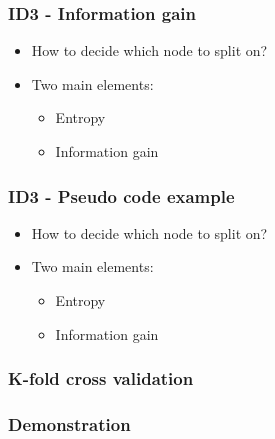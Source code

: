 \documentclass{beamer}
\begin{document}
\begin{frame}
\frametitle{ID3 - Information gain}
\begin{itemize}
		\item  How to decide which node to split on? 
		\item Two main elements:
		\begin{itemize}
			\item Entropy
			\item Information gain
		\end{itemize}

	\end{itemize}
\end{frame}

\begin{frame}
\frametitle{ID3 - Pseudo code example}
\begin{itemize}
		\item  How to decide which node to split on? 
		\item Two main elements:
		\begin{itemize}
			\item Entropy
			\item Information gain
		\end{itemize}

	\end{itemize}
\end{frame}



\begin{frame}
\frametitle{K-fold cross validation}

\end{frame}

\begin{frame}
\frametitle{Demonstration}

\end{frame}
\end{document}
